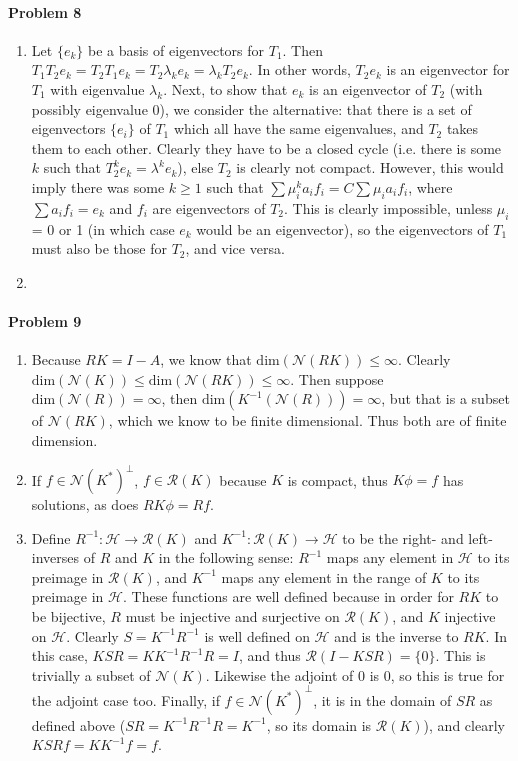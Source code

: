 \documentclass[12pt]{article}
\renewcommand{\dim}{\text{dim}}
\renewcommand{\null}{\mathcal{N}}
\newcommand{\ran}{\mathcal{R}}
\newcommand{\R}{\mathcal{R}}
\renewcommand{\H}{\mathcal{H}}
\begin{document}
\paragraph{Problem 8}
\begin{enumerate}[label=\alph*)]
\item Let $\{e_k\}$ be a basis of eigenvectors for $T_1$. Then $T_1T_2e_k =
  T_2T_1e_k = T_2\lambda_ke_k = \lambda_kT_2e_k$. In other words, $T_2e_k$ is
  an eigenvector for $T_1$ with eigenvalue $\lambda_k$. Next, to show that
  $e_k$ is an eigenvector of $T_2$ (with possibly eigenvalue 0), we consider
  the alternative: that there is a set of eigenvectors $\{e_i\}$ of $T_1$ which
  all have the same eigenvalues, and $T_2$ takes them to each other. Clearly
  they have to be a closed cycle (i.e. there is some $k$ such that $T_2^ke_k =
  \lambda^ke_k$), else $T_2$ is clearly not compact. However, this would imply
  there was some $k\geq 1$ such that $\sum\mu_i^ka_if_i = C\sum\mu_ia_if_i$,
  where $\sum a_if_i = e_k$ and $f_i$ are eigenvectors of $T_2$. This is
  clearly impossible, unless $\mu_i$ = 0 or 1 (in which case $e_k$ would be an
  eigenvector), so the eigenvectors of $T_1$ must also be those for
  $T_2$, and vice versa.
\item 
\end{enumerate}

\paragraph{Problem 9}

\begin{enumerate}[label=\alph*)]
\item Because $RK = I-A$, we know that $\dim(\null(RK)) \leq \infty$. Clearly
  $\dim(\null(K)) \leq \dim(\null(RK)) \leq \infty$. Then suppose $\dim(\null(R))
  = \infty$, then $\dim(K^{-1}(\null(R))) = \infty$, but that is a subset of
  $\null(RK)$, which we know to be finite dimensional. Thus both are of finite
  dimension.
\item If $f \in \null(K^*)^\bot$,  $f \in \ran(K)$ because $K$ is compact, thus
  $K\phi = f$ has solutions, as does $RK\phi = Rf$. 
\item Define $R^{-1}: \mathcal{H} \to \R(K)$ and $K^{-1}: \R(K)\to\mathcal{H}$
  to be the right- and left-inverses of $R$ and $K$ in the following sense:
  $R^{-1}$ maps any element in $\H$ to its preimage in $\R(K)$, and $K^{-1}$
  maps any element in the range of $K$ to its preimage in $\H$. These functions
  are well defined because in order for $RK$ to be bijective, $R$ must be
  injective and surjective on $\R(K)$, and $K$ injective on $\H$. Clearly $S =
  K^{-1}R^{-1}$ is well defined on $\H$ and is the inverse to $RK$. In this case,
  $KSR = KK^{-1}R^{-1}R = I$, and thus $\R(I-KSR) = \{0\}$.
  This is trivially a subset of $\null(K)$. Likewise the adjoint of 0 is 0,
  so this is true for the adjoint case too. Finally, if $f\in\null(K^*)^\bot$, it
  is in the domain of $SR$ as defined above ($SR = K^{-1}R^{-1}R = K^{-1}$, so
  its domain is $\R(K)$), and clearly $KSRf = KK^{-1}f = f$.
\end{enumerate}
\end{document}
